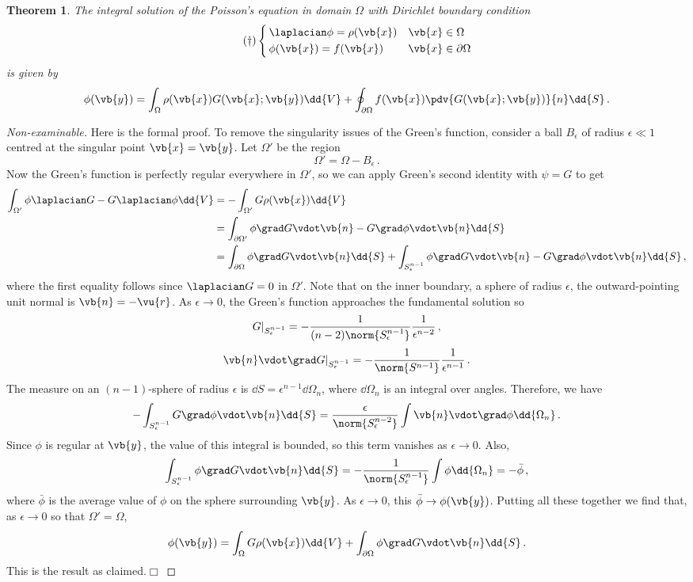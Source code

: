 \documentclass{article}
\theoremstyle{plain}\theoremheaderfont{\normalfont\itshape}\theorembodyfont{\rmfamily}\theoremseparator{.}\newtheorem*{rem}{Remark}\newtheorem*{ex}{Example}\newtheorem*{proof}{Proof}\newtheorem*{altp}{Alternative proof}
\theoremstyle{plain}\theoremheaderfont{\normalfont\bfseries}\theorembodyfont{\rmfamily}\theoremseparator{.}\newtheorem{thm}{Theorem}[section]\newtheorem{lem}[thm]{Lemma}\newtheorem{prop}[thm]{Proposition}\newtheorem*{cor}{Corollary}\newtheorem{defn}[thm]{Definition}\newtheorem{clm}[thm]{Claim}\newtheorem{clminproof}{Claim}
\theoremstyle{break}\theoremheaderfont{\normalfont\itshape}\theorembodyfont{\rmfamily}\theoremseparator{.\medskip}\newtheorem*{proofskip}{Proof}\newtheorem*{exs}{Examples}\newtheorem*{rems}{Remarks}
\theoremstyle{break}\theoremheaderfont{\normalfont\bfseries}\theorembodyfont{\rmfamily}\theoremseparator{.\medskip}\newtheorem{lemskip}[thm]{Lemma}\newtheorem{defnskip}[thm]{Definition}\newtheorem{propskip}[thm]{Proposition}\newtheorem{thmskip}[thm]{Theorem}
\numberwithin{equation}{section}
\newcommand{\qed}{\hfill\ensuremath{\Box}}
\begin{document}
	\begin{thm}\label{intpoi}
		The integral solution of the Poisson's equation in domain \(\Omega\) with Dirichlet boundary condition
		\begin{equation}\tag{\(\dagger\)}
			\left\{\begin{aligned}
				&\,\laplacian\phi=\rho(\vb{x}) && \vb{x}\in\Omega\\
				&\,\phi(\vb{x})=f(\vb{x}) && \vb{x}\in\partial\Omega
			\end{aligned}\right.
		\end{equation}
		is given by
		\[\phi(\vb{y})=\int_\Omega\rho(\vb{x})G(\vb{x};\vb{y})\dd{V}+\oint_{\partial\Omega}f(\vb{x})\pdv{G(\vb{x};\vb{y})}{n}\dd{S}\,.\]
	\end{thm}
	\begin{proof}[Non-examinable]
		Here is the formal proof. To remove the singularity issues of the Green's function, consider a ball \(B_\epsilon\) of radius \(\epsilon\ll 1\) centred at the singular point \(\vb{x}=\vb{y}\). Let \(\Omega'\) be the region
		\[\Omega'=\Omega-B_\epsilon\,.\]
		Now the Green's function is perfectly regular everywhere in \(\Omega'\), so we can apply Green's second identity with \(\psi=G\) to get
		\begin{align*}
			\int_{\Omega'}\phi\laplacian G-G\laplacian\phi\dd{V}&=-\int_{\Omega'}G\rho(\vb{x})\dd{V}\\
			&=\int_{\partial\Omega'}\phi\grad G\vdot\vb{n}-G\grad\phi\vdot\vb{n}\dd{S}\\
			&=\int_{\partial\Omega}\phi\grad G\vdot\vb{n}\dd{S}+\int_{S_{\epsilon}^{n-1}}\phi\grad G\vdot\vb{n}-G\grad\phi\vdot\vb{n}\dd{S}\,,
		\end{align*}
		where the first equality follows since \(\laplacian G=0\) in \(\Omega'\). Note that on the inner boundary, a sphere of radius \(\epsilon\), the outward-pointing unit normal is \(\vb{n} = -\vu{r}\). As \(\epsilon\to 0\), the Green's function approaches the fundamental solution so
		\[G|_{S_{\epsilon}^{n-1}}=-\frac{1}{(n-2)\norm{S_{\epsilon}^{n-1}}}\frac{1}{\epsilon^{n-2}}\,,\]
		\[\vb{n}\vdot\grad G|_{S_{\epsilon}^{n-1}}=-\frac{1}{\norm{S^{n-1}}}\frac{1}{\epsilon^{n-1}}\,.\]
		The measure on an \((n-1)\)-sphere of radius \(\epsilon\) is \(\dd{S}=\epsilon^{n-1}\dd{\Omega_n}\), where \(\dd{\Omega_n}\) is an integral over angles. Therefore, we have
		\[-\int_{S_{\epsilon}^{n-1}}G\grad\phi\vdot\vb{n}\dd{S}=\frac{\epsilon}{\norm{S_{\epsilon}^{n-2}}}\int\vb{n}\vdot\grad\phi\dd{\Omega_n}\,.\]
		Since \(\phi\) is regular at \(\vb{y}\), the value of this integral is bounded, so this term vanishes as \(\epsilon\to 0\). Also,
		\[\int_{S_{\epsilon}^{n-1}}\phi\grad G\vdot\vb{n}\dd{S}=-\frac{1}{\norm{S_{\epsilon}^{n-1}}}\int\phi\dd{\Omega_n}=-\bar{\phi}\,,\]
		where \(\bar{\phi}\) is the average value of \(\phi\) on the sphere surrounding \(\vb{y}\). As \(\epsilon\to 0\), this \(\bar{\phi}\to\phi(\vb{y})\). Putting all these together we find that, as \(\epsilon\to 0\) so that \(\Omega'=\Omega\),
		\[\phi(\vb{y})=\int_{\Omega}G\rho(\vb{x})\dd{V}+\int_{\partial\Omega}\phi\grad G\vdot\vb{n}\dd{S}\,.\]
		This is the result as claimed.\qed
	\end{proof}
\end{document}
